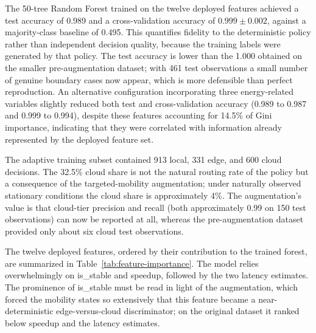 The 50-tree Random Forest trained on the twelve deployed features achieved a test
accuracy of 0.989 and a cross-validation accuracy of $0.999 \pm 0.002$, against a
majority-class baseline of 0.495. This quantifies fidelity to the deterministic
policy rather than independent decision quality, because the training labels were
generated by that policy. The test accuracy is lower than the 1.000 obtained on
the smaller pre-augmentation dataset; with 461 test observations a small number of
genuine boundary cases now appear, which is more defensible than perfect
reproduction. An alternative configuration incorporating three energy-related
variables slightly reduced both test and cross-validation accuracy (0.989 to
0.987 and 0.999 to 0.994), despite these features accounting for 14.5\% of Gini
importance, indicating that they were correlated with information already
represented by the deployed feature set.

The adaptive training subset contained 913 local, 331 edge, and 600 cloud
decisions. The 32.5\% cloud share is not the natural routing rate of the policy
but a consequence of the targeted-mobility augmentation; under naturally observed
stationary conditions the cloud share is approximately 4\%. The augmentation's
value is that cloud-tier precision and recall (both approximately 0.99 on 150
test observations) can now be reported at all, whereas the pre-augmentation
dataset provided only about six cloud test observations.

The twelve deployed features, ordered by their contribution to the trained
forest, are summarized in Table~\ref{tab:feature-importance}. The model relies
overwhelmingly on is\_stable and speedup, followed by the two latency estimates.
The prominence of is\_stable must be read in light of the augmentation, which
forced the mobility states so extensively that this feature became a
near-deterministic edge-versus-cloud discriminator; on the original dataset it
ranked below speedup and the latency estimates.


